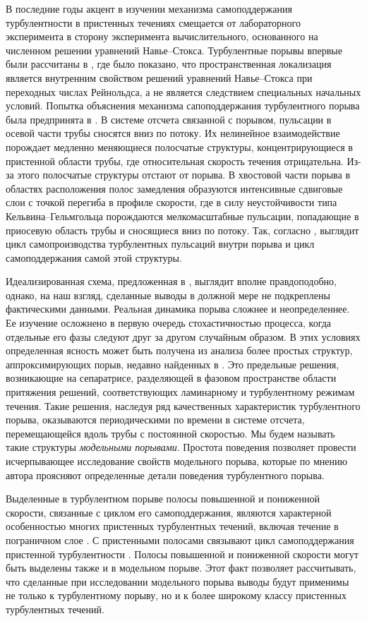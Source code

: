 В последние годы акцент в изучении механизма самоподдержания турбулентности в пристенных течениях смещается от лабораторного эксперимента в сторону эксперимента вычислительного, основанного на численном решении уравнений Навье--Стокса. Турбулентные порывы впервые были рассчитаны в \cite{Priymak2004}, где было показано, что пространственная локализация является внутренним свойством решений уравнений Навье--Стокса при переходных числах Рейнольдса, а не является следствием специальных начальных условий. Попытка объяснения механизма сапоподдержания турбулентного порыва была предпринята в \cite{Shimizu2009}. В системе отсчета связанной с порывом, пульсации в осевой части трубы сносятся вниз по потоку. Их нелинейное взаимодействие порождает медленно меняющиеся полосчатые структуры, концентрирующиеся в пристенной области трубы, где относительная скорость течения отрицательна. Из-за этого полосчатые структуры отстают от порыва. В хвостовой части порыва в областях расположения полос замедления образуются интенсивные сдвиговые слои с точкой перегиба в профиле скорости, где в силу неустойчивости типа Кельвина--Гельмгольца порождаются мелкомасштабные пульсации, попадающие в приосевую область трубы и сносящиеся вниз по потоку. Так, согласно \cite{Shimizu2009}, выглядит цикл самопроизводства турбулентных пульсаций внутри порыва и цикл самоподдержания самой этой структуры.

Идеализированная схема, предложенная в \cite{Shimizu2009}, выглядит вполне правдоподобно, однако, на наш взгляд, сделанные выводы в должной мере не подкреплены фактическими данными. Реальная динамика порыва сложнее и неопределеннее. Ее изучение осложнено в первую очередь стохастичностью процесса, когда отдельные его фазы следуют друг за другом случайным образом. В этих условиях определенная ясность может быть получена из анализа более простых структур, аппроксимирующих порыв, недавно найденных в \cite{Skufca2006, Avila2013}. Это предельные решения, возникающие на сепаратрисе, разделяющей в фазовом пространстве области притяжения решений, соответствующих ламинарному и турбулентному режимам течения. Такие решения, наследуя ряд качественных характеристик турбулентного порыва, оказываются периодическими по времени в системе отсчета, перемещающейся вдоль трубы с постоянной скоростью. Мы будем называть такие структуры {\it модельными порывами}. Простота поведения позволяет провести исчерпывающее исследование свойств модельного порыва, которые по мнению автора проясняют определенные детали поведения турбулентного порыва. 

Выделенные в турбулентном порыве полосы повышенной и пониженной скорости, связанные с циклом его самоподдержания, являются характерной особенностью многих пристенных турбулентных течений, включая течение в пограничном слое \cite{Klebanoff1962, Kline1967}. С пристенными полосами связывают цикл самоподдержания пристенной турбулентности \cite{Waleffe1997, Hamilton1995, Schoppa2002}. Полосы повышенной и пониженной скорости могут быть выделены также и в модельном порыве. Этот факт позволяет рассчитывать, что сделанные при исследовании модельного порыва выводы будут применимы не только к турбулентному порыву, но и к более широкому классу пристенных турбулентных течений. 


